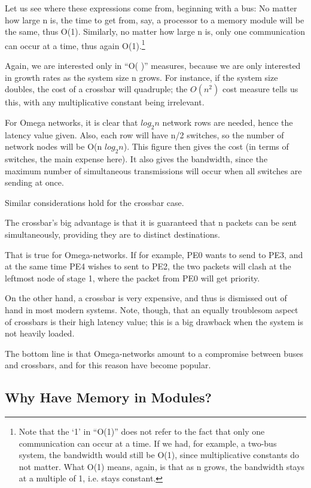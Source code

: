 Let us see where these expressions come from, beginning with a bus: No
matter how large n is, the time to get from, say, a processor to a
memory module will be the same, thus O(1). Similarly, no matter how
large n is, only one communication can occur at a time, thus again
O(1).\footnote{ Note that the `1' in ``O(1)'' does not refer to the fact
that only one communication can occur at a time. If we had, for example,
a two-bus system, the bandwidth would still be O(1), since
multiplicative constants do not matter. What O(1) means, again, is that
as n grows, the bandwidth stays at a multiple of 1, i.e.  stays
constant.  }

Again, we are interested only in ``O( )'' measures, because we are only
interested in growth rates as the system size n grows. For instance, if
the system size doubles, the cost of a crossbar will quadruple; the \(
O(n^{2}) \) cost measure tells us this, with any multiplicative constant
being irrelevant.

For Omega networks, it is clear that \( log_{2}n \) network rows are
needed, hence the latency value given. Also, each row will have n/2
switches, so the number of network nodes will be O(n \( log_{2}n \)).
This figure then gives the cost (in terms of switches, the main expense
here). It also gives the bandwidth, since the maximum number of
simultaneous transmissions will occur when all switches are sending at
once.

Similar considerations hold for the crossbar case.

The crossbar's big advantage is that it is guaranteed that n packets can
be sent simultaneously, providing they are to distinct
destinations.

That is  true for Omega-networks. If for example, PE0
wants to send to PE3, and at the same time PE4 wishes to sent to PE2,
the two packets will clash at the leftmost node of stage 1, where the
packet from PE0 will get priority.

On the other hand, a crossbar is very expensive, and thus is dismissed
out of hand in most modern systems. Note, though, that an equally
troublesom aspect of crossbars is their high latency value; this is a
big drawback when the system is not heavily loaded.

The bottom line is that Omega-networks amount to a compromise between
buses and crossbars, and for this reason have become popular.

\subsection{Why Have Memory in Modules?}

